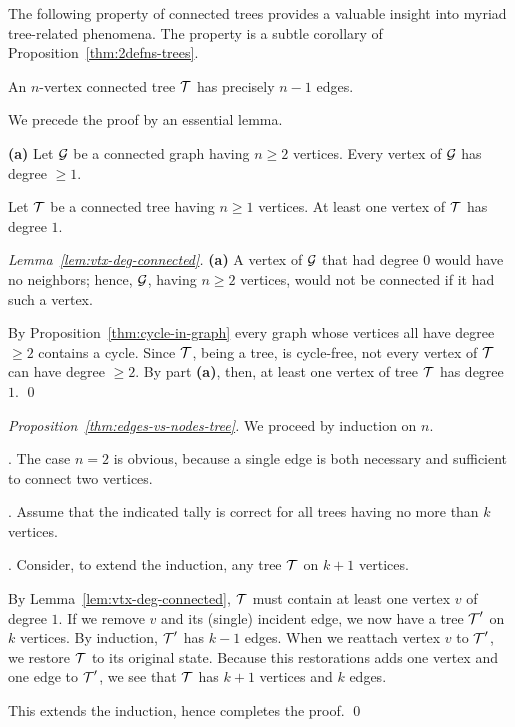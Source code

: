 \bigskip

The following property of connected trees provides a valuable insight into myriad tree-related phenomena.  The property is a subtle  corollary of Proposition~\ref{thm:2defns-trees}.

\begin{prop}
\label{thm:edges-vs-nodes-tree}
An $n$-vertex connected tree $\mbox{$\cal T$}$ has precisely $n-1$ edges.
\end{prop}

We precede the proof by an essential lemma.

\begin{lemma}
\label{lem:vtx-deg-connected}
{\bf (a)}
Let $\mbox{$\cal G$}$ be a connected graph having $n \geq 2$ vertices.  Every vertex of $\mbox{$\cal G$}$ has degree $\geq 1$.

\smallskip

Let $\mbox{$\cal T$}$ be a connected tree having $n \geq 1$ vertices.  At least one vertex of $\mbox{$\cal T$}$ has degree $1$.
\end{lemma}

\begin{proof}[Lemma~\ref{lem:vtx-deg-connected}]
{\bf (a)} A vertex of $\mbox{$\cal G$}$ that had degree $0$ would have no neighbors; hence, $\mbox{$\cal G$}$, having $n \geq 2$ vertices, would not be connected if it had such a vertex.

\smallskip

By Proposition~\ref{thm:cycle-in-graph} every graph whose vertices all have degree $\geq 2$
contains a cycle.  Since $\mbox{$\cal T$}$, being a tree, is cycle-free, not every vertex of $\mbox{$\cal T$}$ can have degree $\geq 2$.  By part {\bf (a)}, then, at least one vertex of tree $\mbox{$\cal T$}$ has degree $1$.  \qed
\end{proof}

\begin{proof}[Proposition~\ref{thm:edges-vs-nodes-tree}]
We proceed by induction on $n$.

\smallskip

.
The case $n=2$ is obvious, because a single edge is both necessary and sufficient to connect two vertices.

\smallskip

.
Assume that the indicated tally is correct for all trees having no more than $k$ vertices.

\smallskip

.
Consider, to extend the induction, any tree $\mbox{$\cal T$}$ on $k+1$ vertices.  

\smallskip

By Lemma~\ref{lem:vtx-deg-connected}, $\mbox{$\cal T$}$ must contain at least one vertex $v$ of degree $1$.  If we remove $v$ and its (single) incident edge, we now have a tree $\mbox{$\cal T$}'$ on $k$ vertices.
By induction, $\mbox{$\cal T$}'$ has $k-1$ edges.  When we reattach vertex $v$ to $\mbox{$\cal T$}'$, we restore $\mbox{$\cal T$}$ to its original state.  Because this restorations adds one vertex and one edge to $\mbox{$\cal T$}'$, we see that $\mbox{$\cal T$}$ has $k+1$ vertices and $k$ edges.

\smallskip

This extends the induction, hence completes the proof.  \qed
\end{proof}

